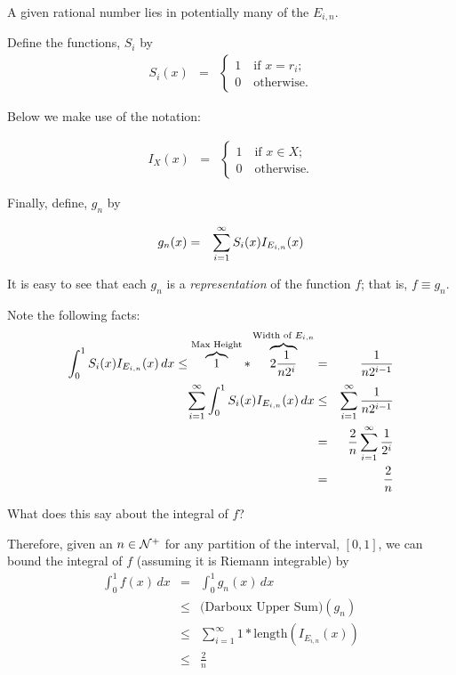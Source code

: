 \documentclass{article}
\begin{document}
A given rational number lies in potentially many of the $E_{i,n}$.

Define the functions, $S_i$ by
\begin{eqnarray}
	S_{i}(x) & = & \begin{cases} 1 \quad \text{if $x = r_i$}; \\ 
	 							  0 \quad \text{otherwise.} 
					\end{cases}
\end{eqnarray}

Below we make use of the notation: 

\begin{eqnarray}
I_X(x) & = & \begin{cases} 1 \quad \text{if $x \in X$}; \\ 0 \quad \text{otherwise.} \end{cases}
\end{eqnarray}

Finally, define, $g_n$ by

\begin{eqnarray}
	g_{n}(x) & = & \sum_{i=1}^\infty\limits S_{i}(x) I_{E_{i,n}}(x)
\end{eqnarray}

It is easy to see that each $g_n$ is a {\em representation\/} of the function $f$; 
that is, $f \equiv g_n$.

Note the following facts:
\begin{eqnarray*}
	\int_0^1 S_{i}(x) I_{E_{i,n}}(x)\, dx \le \overbrace{1}^{\text{Max Height}} * \overbrace{2\frac{1}{n2^{i}}}^{\text{Width of $E_{i,n}$}} 
														  & = & \frac{1}{n2^{i-1}} \\
  \sum_{i=1}^\infty \int_0^1 S_{i}(x) I_{E_{i,n}}(x)\, dx & \le & \sum_{i=1}^\infty\limits \frac{1}{n2^{i-1}}  \\ 
														  & =  & \frac{2}{n} \sum_{i=1}^\infty\limits \frac{1}{2^{i}} \\
													  	  & =  & \frac{2}{n}
 \end{eqnarray*}

What does this say about the integral of $f$? 

Therefore, given an $n \in {\cal N}^+$ for any partition of the interval, $[0,1]$, we can bound the integral of $f$ 
(assuming it is Riemann integrable) by
\begin{eqnarray*}
	\int_0^1 f(x) \, dx & =   & \int_0^1 g_{n}(x) \, dx \\
						& \le & \text{(Darboux Upper Sum)}(g_n)  \\
						& \le & \sum_{i=1}^\infty 1 * \text{length}(I_{E_{i,n}}(x)) \\
						& \le & \frac{2}{n}
\end{eqnarray*}
\end{document}
